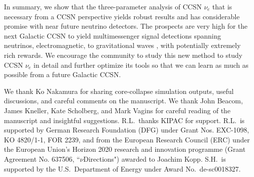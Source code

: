 \documentclass[aps,reprint,superscriptaddress]{revtex4-1}
\begin{document}
In summary, we show that the three-parameter analysis of CCSN $\nu_e$ that is necessary from a CCSN perspective yields robust results and has considerable promise with near future neutrino detectors. The prospects are very high for the next Galactic CCSN to yield multimessenger signal detections spanning neutrinos, electromagnetic, to gravitational waves \cite{Nakamura:2016kkl}, with potentially extremely rich rewards. We encourage the community to study this new method to study  CCSN  $\nu_e$ in detail and further optimize its tools so that we can learn as much as possible from a future Galactic CCSN.

\begin{acknowledgments}

We thank Ko Nakamura for sharing core-collapse simulation outputs, useful discussions, and careful comments on the manuscript. We thank John Beacom, James Kneller, Kate Scholberg, and Mark Vagins for careful reading of the manuscript and insightful suggestions. R.L.~thanks KIPAC for support.  R.L.~is supported by German Research  Foundation  (DFG)  under  Grant  Nos.  EXC-1098, KO 4820/1-1, FOR 2239, and from the European Research Council (ERC) under the European Union's Horizon 2020 research and innovation programme  (Grant  Agreement  No.  637506,  ``$\nu$Directions") awarded to Joachim Kopp.   S.H.~is supported by the U.S.~Department of Energy under Award No.~de-sc0018327.

\end{acknowledgments}


\end{document}
